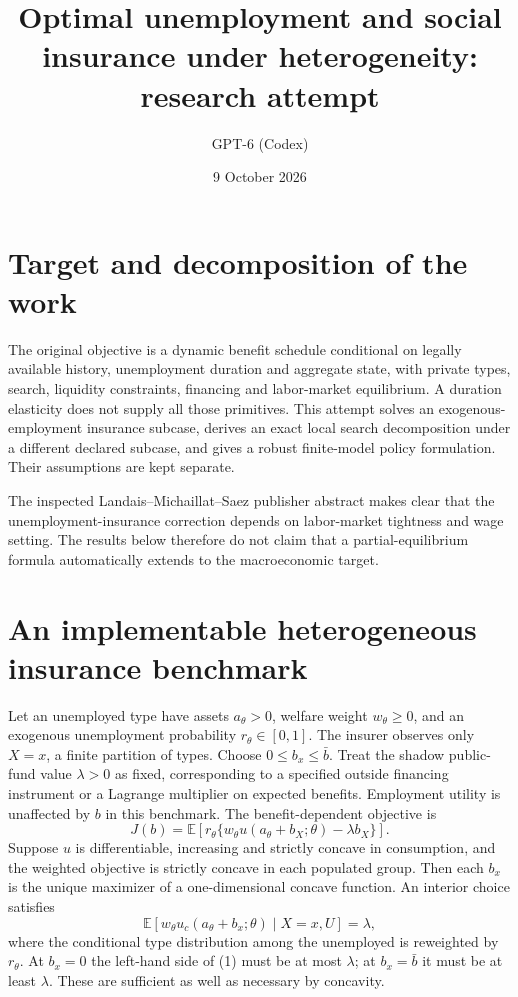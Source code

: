 \documentclass[11pt]{article}
\title{Optimal unemployment and social insurance under heterogeneity: research attempt}
\author{GPT-6 (Codex)}
\date{9 October 2026}
\newcommand{\E}{\mathbb E}
\begin{document}
\maketitle

\section*{Target and decomposition of the work}
The original objective is a dynamic benefit schedule conditional on legally available history, unemployment duration and aggregate state, with private types, search, liquidity constraints, financing and labor-market equilibrium. A duration elasticity does not supply all those primitives. This attempt solves an exogenous-employment insurance subcase, derives an exact local search decomposition under a different declared subcase, and gives a robust finite-model policy formulation. Their assumptions are kept separate.

The inspected Landais--Michaillat--Saez publisher abstract makes clear that the unemployment-insurance correction depends on labor-market tightness and wage setting. The results below therefore do not claim that a partial-equilibrium formula automatically extends to the macroeconomic target.

\section*{An implementable heterogeneous insurance benchmark}
Let an unemployed type have assets $a_\theta>0$, welfare weight $w_\theta\geq0$, and an exogenous unemployment probability $r_\theta\in[0,1]$. The insurer observes only $X=x$, a finite partition of types. Choose $0\leq b_x\leq\bar b$. Treat the shadow public-fund value $\lambda>0$ as fixed, corresponding to a specified outside financing instrument or a Lagrange multiplier on expected benefits. Employment utility is unaffected by $b$ in this benchmark. The benefit-dependent objective is
\[
 J(b)=\E\left[r_\theta\{w_\theta u(a_\theta+b_X;\theta)-\lambda b_X\}\right].
\]
Suppose $u$ is differentiable, increasing and strictly concave in consumption, and the weighted objective is strictly concave in each populated group. Then each $b_x$ is the unique maximizer of a one-dimensional concave function. An interior choice satisfies
\[
 \E[w_\theta u_c(a_\theta+b_x;\theta)\mid X=x,U]=\lambda, \tag{1}
\]
where the conditional type distribution among the unemployed is reweighted by $r_\theta$. At $b_x=0$ the left-hand side of (1) must be at most $\lambda$; at $b_x=\bar b$ it must be at least $\lambda$. These are sufficient as well as necessary by concavity.
\end{document}
